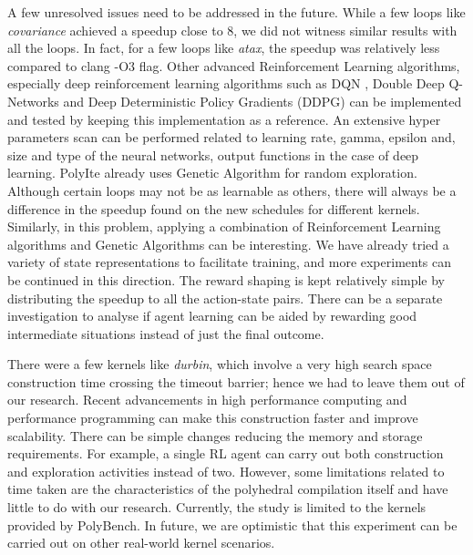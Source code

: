 \documentclass[logo,msc]{infthesis}           %
\begin{document}
A few unresolved issues need to be addressed in the future. While a few loops like \textit{covariance} achieved a speedup close to 8, we did not witness similar results with all the loops. In fact, for a few loops like \textit{atax}, the speedup was relatively less compared to clang -O3 flag. Other advanced Reinforcement Learning algorithms, especially deep reinforcement learning algorithms such as DQN \cite{DBLP:journals/corr/MnihKSGAWR13}, Double Deep Q-Networks \cite{DDQN} and Deep Deterministic Policy Gradients (DDPG) \cite{BHATNAGAR20092471} can be implemented and tested by keeping this implementation as a reference. An extensive hyper parameters scan can be performed related to learning rate, gamma, epsilon and, size and type of the neural networks, output functions in the case of deep learning. PolyIte already uses Genetic Algorithm for random exploration. Although certain loops may not be as learnable as others, there will always be a difference in the speedup found on the new schedules for different kernels.
Similarly, in this problem, applying a combination of Reinforcement Learning algorithms and Genetic Algorithms\cite{GA} can be interesting. We have already tried a variety of state representations to facilitate training, and more experiments can be continued in this direction. The reward shaping is kept relatively simple by distributing the speedup to all the action-state pairs. There can be a separate investigation to analyse if agent learning can be aided by rewarding good intermediate situations instead of just the final outcome.

There were a few kernels like \textit{durbin}, which involve a very high search space construction time crossing the timeout barrier; hence we had to leave them out of our research. Recent advancements in high performance computing and performance programming can make this construction faster and improve scalability. There can be simple changes reducing the memory and storage requirements. For example, a single RL agent can carry out both construction and exploration activities instead of two. However, some limitations related to time taken are the characteristics of the polyhedral compilation itself and have little to do with our research. Currently, the study is limited to the kernels provided by PolyBench. In future, we are optimistic that this experiment can be carried out on other real-world kernel scenarios.





\end{document}
